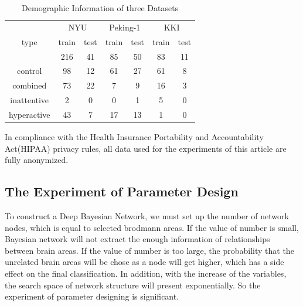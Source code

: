 \documentclass[10pt,twocolumn,letterpaper]{article}
\begin{document}
\begin{table}[h]
\label{tab:Information}
\caption{Demographic Information of three Datasets}
\begin{center}
\begin{tabular}{|c|c|c|c|c|c|c|}
\hline
\multirow{3}{*}{type}	& \multicolumn{2}{c|}{NYU} & \multicolumn{2}{c|}{Peking-1} & \multicolumn{2}{c|}{KKI} \\
\cline{2-7}\rule{0pt}{5pt}
					 	& train &  test  & train	& test 	& train & test  \\
						& 216	& 41	  &    85   &   50  &   83   &   11 \\ [2pt]
\hline \rule{0pt}{12pt}
control					& 98	    & 12    &    61   &    27 &   61    &   8 \\
combined					& 73		& 22   &    7    &    9  &   16    &   3 \\
inattentive				& 2		& 0    &    0    &    1  &   5     &   0 \\
hyperactive				& 43		& 7    &    17   &    13 &   1    &   0 \\[2pt]
\hline
\end{tabular}
\end{center}
\end{table}
In compliance with the Health Insurance Portability and Accountability Act(HIPAA) privacy rules, all data used for the experiments of this article are fully anonymized.


\subsection{The Experiment of Parameter Design}
To construct a Deep Bayesian Network, we must set up the number of network nodes, which is equal to selected brodmann areas. If the value of number is small, Bayesian network will not extract the enough information of relationships between brain areas. If the value of number is too large, the probability that the unrelated brain areas will be chose as a node will get higher, which has a side effect on the final classification. In addition,  with the increase of the variables, the search space of network structure will present exponentially. So the experiment of parameter designing is significant.
\end{document}
